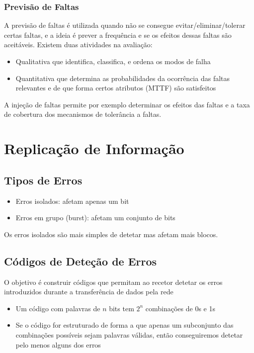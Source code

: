 \documentclass[10pt,a4paper]{report}
\begin{document}
\subsubsection{Previsão de Faltas}
A previsão de faltas é utilizada quando não se consegue evitar/eliminar/tolerar certas faltas, e a ideia é prever a frequência e se os efeitos dessas faltas são aceitáveis. Existem duas atividades na avaliação:
\begin{itemize}
\item Qualitativa que identifica, classifica, e ordena os modos de falha
\item Quantitativa que determina as probabilidades da ocorrência das faltas relevantes e de que forma certos atributos (MTTF) são satisfeitos
\end{itemize}
A injeção de faltas permite por exemplo determinar os efeitos das faltas e a taxa de cobertura dos mecanismos de tolerância a faltas.
\section{Replicação de Informação}
\subsection{Tipos de Erros}
\begin{itemize}
\item Erros isolados: afetam apenas um bit
\item Erros em grupo (burst): afetam um conjunto de bits
\end{itemize}
Os erros isolados são mais simples de detetar mas afetam mais blocos.
\subsection{Códigos de Deteção de Erros}
O objetivo é construir códigos que permitam ao recetor detetar os erros introduzidos durante a transferência de dados pela rede
\begin{itemize}
\item Um código com palavras de $n$ bits tem $2^n$ combinações de 0s e 1s
\item Se o código for estruturado de forma a que apenas um subconjunto das combinações possíveis sejam palavras válidas, então conseguiremos detetar pelo menos alguns dos erros
\end{itemize}
\end{document}
